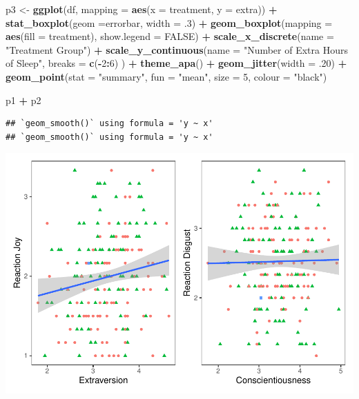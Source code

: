 \documentclass[
]{book}
\newenvironment{Shaded}{\begin{snugshade}}{\end{snugshade}}
\newcommand{\AttributeTok}[1]{\textcolor[rgb]{0.13,0.29,0.53}{#1}}
\newcommand{\ConstantTok}[1]{\textcolor[rgb]{0.56,0.35,0.01}{#1}}
\newcommand{\DecValTok}[1]{\textcolor[rgb]{0.00,0.00,0.81}{#1}}
\newcommand{\FunctionTok}[1]{\textcolor[rgb]{0.13,0.29,0.53}{\textbf{#1}}}
\newcommand{\NormalTok}[1]{#1}
\newcommand{\OtherTok}[1]{\textcolor[rgb]{0.56,0.35,0.01}{#1}}
\newcommand{\SpecialCharTok}[1]{\textcolor[rgb]{0.81,0.36,0.00}{\textbf{#1}}}
\newcommand{\StringTok}[1]{\textcolor[rgb]{0.31,0.60,0.02}{#1}}
\begin{document}
\begin{Shaded}
\begin{Highlighting}[]
\NormalTok{p3 }\OtherTok{\textless{}{-}} \FunctionTok{ggplot}\NormalTok{(df, }\AttributeTok{mapping =} \FunctionTok{aes}\NormalTok{(}\AttributeTok{x =}\NormalTok{ treatment, }\AttributeTok{y =}\NormalTok{ extra)) }\SpecialCharTok{+} 
  \FunctionTok{stat\_boxplot}\NormalTok{(}\AttributeTok{geom =}\StringTok{\textquotesingle{}errorbar\textquotesingle{}}\NormalTok{, }\AttributeTok{width =}\NormalTok{ .}\DecValTok{3}\NormalTok{) }\SpecialCharTok{+}
  \FunctionTok{geom\_boxplot}\NormalTok{(}\AttributeTok{mapping =} \FunctionTok{aes}\NormalTok{(}\AttributeTok{fill =}\NormalTok{ treatment), }\AttributeTok{show.legend =} \ConstantTok{FALSE}\NormalTok{) }\SpecialCharTok{+} 
  \FunctionTok{scale\_x\_discrete}\NormalTok{(}\AttributeTok{name =} \StringTok{"Treatment Group"}\NormalTok{) }\SpecialCharTok{+} 
  \FunctionTok{scale\_y\_continuous}\NormalTok{(}\AttributeTok{name =} \StringTok{"Number of Extra Hours of Sleep"}\NormalTok{, }
                     \AttributeTok{breaks =} \FunctionTok{c}\NormalTok{(}\SpecialCharTok{{-}}\DecValTok{2}\SpecialCharTok{:}\DecValTok{6}\NormalTok{) }
\NormalTok{                     ) }\SpecialCharTok{+}
  \FunctionTok{theme\_apa}\NormalTok{() }\SpecialCharTok{+}
  \FunctionTok{geom\_jitter}\NormalTok{(}\AttributeTok{width =}\NormalTok{ .}\DecValTok{20}\NormalTok{) }\SpecialCharTok{+}
  \FunctionTok{geom\_point}\NormalTok{(}\AttributeTok{stat =} \StringTok{"summary"}\NormalTok{, }\AttributeTok{fun =} \StringTok{"mean"}\NormalTok{, }\AttributeTok{size =} \DecValTok{5}\NormalTok{, }\AttributeTok{colour =} \StringTok{"black"}\NormalTok{)}


\NormalTok{p1 }\SpecialCharTok{+}\NormalTok{ p2}
\end{Highlighting}
\end{Shaded}

\begin{verbatim}
## `geom_smooth()` using formula = 'y ~ x'
## `geom_smooth()` using formula = 'y ~ x'
\end{verbatim}

\includegraphics{rintro_demo_files/figure-latex/unnamed-chunk-320-1.pdf}
\end{document}

